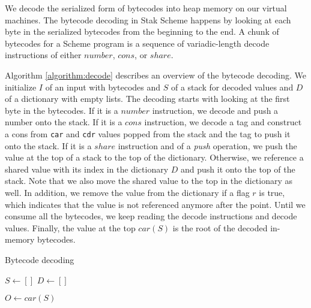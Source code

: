\documentclass[sigplan, anonymous, review]{acmart}
\begin{document}
We decode the serialized form of bytecodes into heap memory on
our virtual machines.
The bytecode decoding in Stak Scheme happens by looking at each byte in
the serialized bytecodes from the beginning to the end.
A chunk of bytecodes for a Scheme program is a sequence of
variadic-length decode instructions of either $number$, $cons$, or $share$.

Algorithm \ref{algorithm:decode} describes an overview of the
bytecode decoding.
We initialize $I$ of an input with bytecodes and $S$ of a stack for decoded
values and $D$ of a dictionary with empty lists.
The decoding starts with looking at the first byte in the bytecodes.
If it is a $number$ instruction, we decode and push a number onto the stack.
If it is a $cons$ instruction, we decode a tag and construct a cons
from \texttt{car} and \texttt{cdr} values popped from the stack
and the tag to push it onto the stack.
If it is a $share$ instruction and of a \textit{push} operation, we push the
value at the top of a stack to the top of the dictionary.
Otherwise, we reference a shared value with its index in the
dictionary $D$ and push it onto the top of the stack.
Note that we also move the shared value to the top in the dictionary as well.
In addition, we remove the value from the dictionary if a flag $r$ is
true, which indicates that the value is not referenced anymore after the point.
Until we consume all the bytecodes, we keep reading the decode instructions and
decode values.
Finally, the value at the top $car(S)$ is the root of the decoded
in-memory bytecodes.

\begin{algorithm}
  \caption{Bytecode decoding}
  \label{algorithm:decode}


  $S \gets []$ \;
  $D \gets []$ \;

  $O \gets car(S)$ \;
\end{algorithm}
\end{document}
